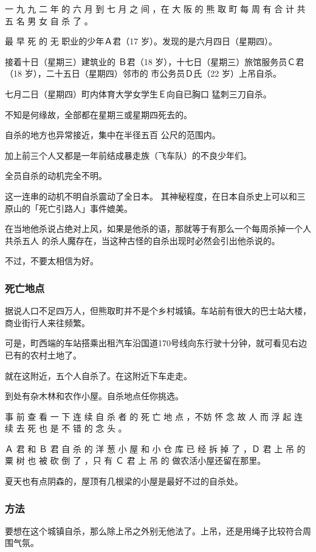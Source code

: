 \documentclass[UTF8]{ctexart}
\begin{document}
一 九 九 二 年 的 六 月 到 七 月 之 间 ，在 大 阪 的 熊 取 町 每 周 有 合 计 共 五 名 男 女 自 杀 了 。

最 早 死 的 无 职业的少年Ａ君（17 岁）。发现的是六月四日（星期四）。

接着十日（星期三）建筑业的 Ｂ君（18 岁），十七日（星期三）旅馆服务员Ｃ君（18 岁），二十五日（星期四）邻市的 市公务员Ｄ氏（22 岁）上吊自杀。

七月二日（星期四）町内体育大学女学生Ｅ向自已胸口 猛刺三刀自杀。 

不知是何缘故，全部都在星期三或星期四死去的。

自杀的地方也异常接近，集中在半径五百 公尺的范围内。

加上前三个人又都是一年前结成暴走族（飞车队）的不良少年们。

全员自杀的动机完全不明。

这一连串的动机不明自杀震动了全日本。
其神秘程度，在日本自杀史上可以和三原山的「死亡引路人」事件媲美。 

在当地他杀说占绝对上风，如果是他杀的语，那就等于有那么一个每周杀掉一个人共杀五人
的杀人魔存在，当这种古怪的自杀出现时必然会引出他杀说的。

不过，不要太相信为好。

\subsubsection{死亡地点}

据说人口不足四万人，但熊取町并不是个乡村城镇。车站前有很大的巴士站大楼，商业街行人来往频繁。

可是，町西端的车站搭乘出租汽车沿国道170号线向东行驶十分钟，就可看见右边已有的农村土地了。

就在这附近，五个人自杀了。在这附近下车走走。

到处有杂木林和农作小屋。自杀地点任你挑选。

事 前 查 看 一 下 连 续 自 杀 者 的 死 亡 地 点 ，不妨 怀 念 故 人 而 浮 起 连 续 去 死 也 是 不 错 的 念 头 。

Ａ 君 和 Ｂ 君 自 杀 的 洋 葱 小 屋 和 小 仓 库 已 经 拆 掉 了 ，Ｄ 君 上 吊 的 粟 树 也 被 砍 倒 了 ，只 有 Ｃ 君 上 吊 的 做农活小屋还留在那里。

夏天也有点阴森的，屋顶有几根梁的小屋是最好不过的自杀处。

\subsubsection{方法}

要想在这个城镇自杀，那么除上吊之外别无他法了。上吊，还是用绳子比较符合周围气氛。
\end{document}
